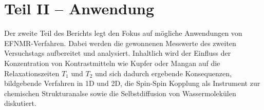 \section{Teil II -- Anwendung}
\label{sec:Teil2}
Der zweite Teil des Berichts legt den Fokus auf mögliche Anwendungen von EFNMR-Verfahren.
Dabei werden die gewonnenen Messwerte des zweiten Versuchstags aufbereitet und analysiert. Inhaltlich wird der Einfluss der Konzentration von Kontrastmitteln wie Kupfer oder Mangan auf die Relaxationszeiten $T_1$ und $T_2$ und sich dadurch ergebende Konsequenzen, bildgebende Verfahren in 1D und 2D, die Spin-Spin Kopplung als Instrument zur chemischen Strukturanalse sowie die Selbstdiffusion von Wassermolekülen diskutiert.





